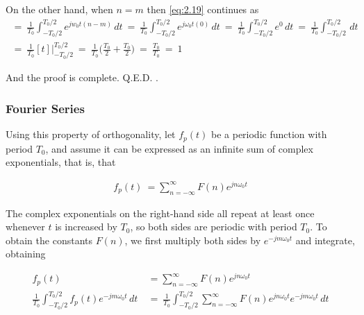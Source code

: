 \documentclass[10pt]{article}
\begin{document}
\noindent
On the other hand, when $n = m$ then \eqref{eq:2.19} continues as
\begin{equation} \label{eq:2.21}
\begin{aligned}
    \: = \: \frac{1}{T_0}\int_{-T_0/2}^{T_0/2} e^{jw_0t(n-m)} \,dt \: = \: \frac{1}{T_0}\int_{-T_0/2}^{T_0/2} e^{j\omega_0t(0)} \,dt \: = \: \frac{1}{T_0}\int_{-T_0/2}^{T_0/2} e^{0} \,dt  \: = \: 
    \frac{1}{T_0}\int_{-T_0/2}^{T_0/2} \,dt \\
    \: = \: \frac{1}{T_0}[t]\Big|_{-T_0/2}^{T_0/2} \: = \: \frac{1}{T_0}\Big(\frac{T_0}{2} + \frac{T_0}{2}\Big) \: = \: \frac{T_0}{T_0} \: = \: 1
\end{aligned}
\end{equation}

\noindent
And the proof is complete. \quad Q.E.D. \:\:  \cite{morrison1994fourier}.


\subsubsection{Fourier Series}
\hspace{\parindent} Using this property of orthogonality, let $f_p(t)$ be a periodic function with period $T_0$, and assume it can be expressed as an infinite sum of complex exponentials, that is, that

\begin{equation} \label{eq:2.22}
\begin{aligned}
    f_p(t) \: = \sum_{n=-\infty}^{\infty} F(n) e^{jn\omega_0t}
\end{aligned}
\end{equation}

The complex exponentials on the right-hand side all repeat at least once whenever $t$ is increased by $T_0$, so both sides are periodic with period $T_0$. To obtain the constants $F(n)$, we first multiply both sides by $e^{-jm\omega_0t}$ and integrate, obtaining

\begin{equation} \label{eq:2.23}
	\begin{aligned}
		f_p(t) \: &= \sum_{n=-\infty}^{\infty} F(n) e^{jn\omega_0t} \\
		\frac{1}{T_0}\int_{-T_0/2}^{T_0/2} f_p(t) e^{-jm\omega_0t} \,dt \: &= \: \frac{1}{T_0}\int_{-T_0/2}^{T_0/2}\sum_{n=-\infty}^{\infty} F(n) e^{jn\omega_0t} e^{-jm\omega_0t} \,dt \\
	\end{aligned}
\end{equation}
\end{document}
